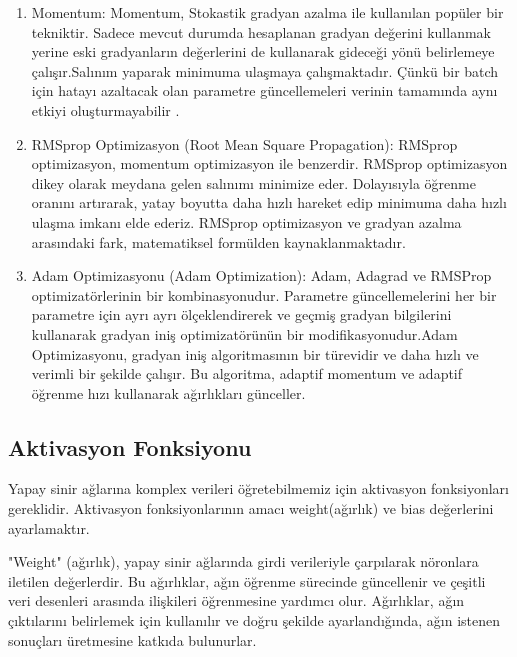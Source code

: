 \documentclass[12pt, a4paper]{article}
\begin{document}
\begin{enumerate}
				
				\item 	Momentum:
				Momentum, Stokastik gradyan azalma ile kullanılan popüler bir tekniktir. Sadece mevcut durumda hesaplanan gradyan değerini kullanmak yerine eski gradyanların değerlerini de kullanarak gideceği yönü belirlemeye çalışır.Salınım yaparak minimuma ulaşmaya çalışmaktadır. Çünkü bir batch için hatayı azaltacak olan parametre güncellemeleri verinin tamamında aynı etkiyi oluşturmayabilir \cite{rmsprop}.
				
				\item 	RMSprop Optimizasyon (Root Mean Square Propagation):
				RMSprop optimizasyon, momentum optimizasyon ile benzerdir. RMSprop optimizasyon dikey olarak meydana gelen salınımı minimize eder. Dolayısıyla öğrenme oranını artırarak, yatay boyutta daha hızlı hareket edip minimuma daha hızlı ulaşma imkanı elde ederiz. RMSprop optimizasyon ve gradyan azalma arasındaki fark, matematiksel formülden kaynaklanmaktadır\cite{rmsprop}.
				
				\item 	Adam Optimizasyonu (Adam Optimization):
				Adam, Adagrad ve RMSProp optimizatörlerinin bir kombinasyonudur\cite{deep_learning}. Parametre güncellemelerini her bir parametre için ayrı ayrı ölçeklendirerek ve geçmiş gradyan bilgilerini kullanarak gradyan iniş optimizatörünün bir modifikasyonudur.Adam Optimizasyonu, gradyan iniş algoritmasının bir türevidir ve daha hızlı ve verimli bir şekilde çalışır. Bu algoritma, adaptif momentum ve adaptif öğrenme hızı kullanarak ağırlıkları günceller.
				
				
			\end{enumerate}
			
			
			
			\subsection{Aktivasyon Fonksiyonu}
			
			Yapay sinir ağlarına komplex verileri öğretebilmemiz için aktivasyon fonksiyonları gereklidir. Aktivasyon fonksiyonlarının amacı weight(ağırlık) ve bias değerlerini ayarlamaktır.
			
			"Weight" (ağırlık), yapay sinir ağlarında girdi verileriyle çarpılarak nöronlara iletilen değerlerdir. Bu ağırlıklar, ağın öğrenme sürecinde güncellenir ve çeşitli veri desenleri arasında ilişkileri öğrenmesine yardımcı olur. Ağırlıklar, ağın çıktılarını belirlemek için kullanılır ve doğru şekilde ayarlandığında, ağın istenen sonuçları üretmesine katkıda bulunurlar.
			
\end{document}
